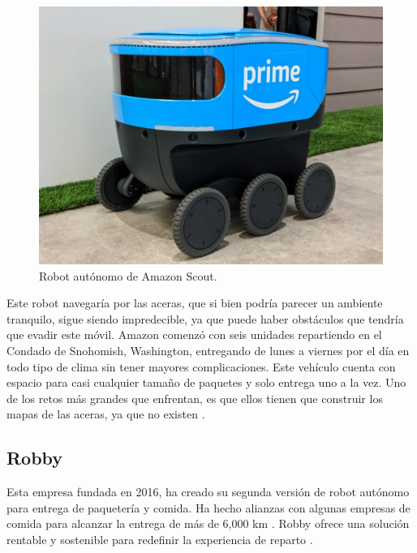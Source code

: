	\begin{figure}[hbtp]
	\centering
	\includegraphics[scale=0.2]{Figures/Scout_Picture.jpg}
	\caption{Robot autónomo de Amazon Scout\cite{scout_picture}.} 
	\end{figure}

Este robot navegaría por las aceras, que si bien podría parecer un ambiente tranquilo, sigue siendo impredecible, ya que puede haber obstáculos que tendría que evadir este móvil. Amazon comenzó con seis unidades repartiendo en el Condado de Snohomish, Washington, entregando de lunes a viernes por el día en todo tipo de clima sin tener mayores complicaciones. Este vehículo cuenta con espacio para casi cualquier tamaño de paquetes y solo entrega uno a la vez. Uno de los retos más grandes que enfrentan, es que ellos tienen que construir los mapas de las aceras, ya que no existen \cite{scout_picture}.

\subsection{Robby} 
Esta empresa fundada en 2016, ha creado su segunda versión de robot autónomo para entrega de paquetería y comida. Ha hecho alianzas con algunas empresas de comida para alcanzar la entrega de más de 6,000 km \cite{robby_zdnet}. Robby ofrece una solución rentable y sostenible para redefinir la experiencia de reparto \cite{robby} .

